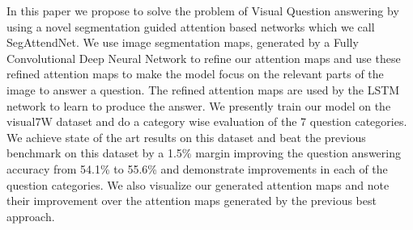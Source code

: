 In this paper we propose to solve the problem of Visual Question answering by using a novel segmentation guided attention based networks which we call SegAttendNet. We use image segmentation maps, generated by a Fully Convolutional Deep Neural Network to refine our attention maps and use these refined attention maps to make the model focus on the relevant parts of the image to answer a question. The refined attention maps are used by the LSTM network to learn to produce the answer. We presently train our model on the visual7W dataset and do a category wise evaluation of the 7 question categories. We achieve state of the art results on this dataset and beat the previous benchmark on this dataset by a 1.5\% margin improving the question answering accuracy from 54.1\% to 55.6\% and demonstrate improvements in each of the question categories. We also visualize our generated attention maps and note their improvement over the attention maps generated by the previous best approach.
